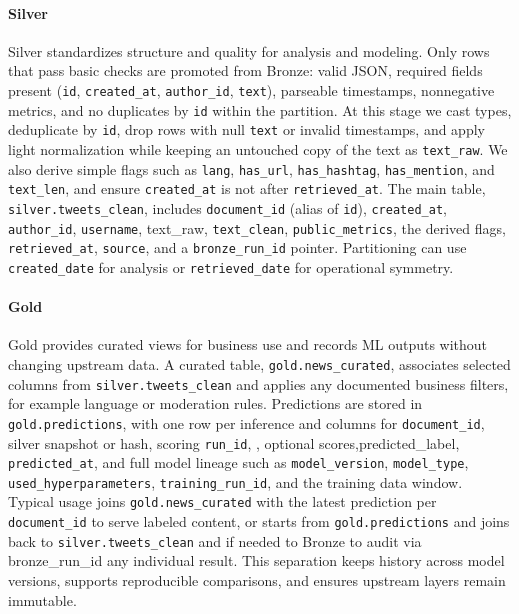 \paragraph{Silver}
Silver standardizes structure and quality for analysis and modeling. Only rows that pass basic checks are promoted from Bronze: valid JSON, required fields present (\texttt{id}, \texttt{created\_at}, \texttt{author\_id}, \texttt{text}), parseable timestamps, nonnegative metrics, and no duplicates by \texttt{id} within the partition. At this stage we cast types, deduplicate by \texttt{id}, drop rows with null \texttt{text} or invalid timestamps, and apply light normalization while keeping an untouched copy of the text as \texttt{text\_raw}. We also derive simple flags such as \texttt{lang}, \texttt{has\_url}, \texttt{has\_hashtag}, \texttt{has\_mention}, and \texttt{text\_len}, and ensure \texttt{created\_at} is not after \texttt{retrieved\_at}. The main table, \texttt{silver.tweets\_clean}, includes \texttt{document\_id} (alias of \texttt{id}), \texttt{created\_at}, \texttt{author\_id}, \texttt{username}, text\_raw, \texttt{text\_clean}, \texttt{public\_metrics}, the derived flags, \texttt{retrieved\_at}, \texttt{source}, and a \texttt{bronze\_run\_id} pointer. Partitioning can use \texttt{created\_date} for analysis or \texttt{retrieved\_date} for operational symmetry.
\paragraph{Gold}
Gold provides curated views for business use and records ML outputs without changing upstream data. A curated table, \texttt{gold.news\_curated}, associates selected columns from \texttt{silver.tweets\_clean} and applies any documented business filters, for example language or moderation rules. Predictions are stored in \texttt{gold.predictions}, with one row per inference and columns for \texttt{document\_id}, silver snapshot or hash, scoring \texttt{run\_id}, , optional scores,predicted\_label, \texttt{predicted\_at}, and full model lineage such as \texttt{model\_version}, \texttt{model\_type}, \texttt{used\_hyperparameters}, \texttt{training\_run\_id}, and the training data window. Typical usage joins \texttt{gold.news\_curated} with the latest prediction per \texttt{document\_id} to serve labeled content, or starts from \texttt{gold.predictions} and joins back to \texttt{silver.tweets\_clean} and if needed to Bronze to audit via bronze\_run\_id any individual result. This separation keeps history across model versions, supports reproducible comparisons, and ensures upstream layers remain immutable.


